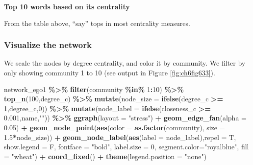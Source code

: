 \documentclass[
]{article}
\newenvironment{Shaded}{\begin{snugshade}}{\end{snugshade}}
\newcommand{\AttributeTok}[1]{\textcolor[rgb]{0.13,0.29,0.53}{#1}}
\newcommand{\DecValTok}[1]{\textcolor[rgb]{0.00,0.00,0.81}{#1}}
\newcommand{\FloatTok}[1]{\textcolor[rgb]{0.00,0.00,0.81}{#1}}
\newcommand{\FunctionTok}[1]{\textcolor[rgb]{0.13,0.29,0.53}{\textbf{#1}}}
\newcommand{\NormalTok}[1]{#1}
\newcommand{\SpecialCharTok}[1]{\textcolor[rgb]{0.81,0.36,0.00}{\textbf{#1}}}
\newcommand{\StringTok}[1]{\textcolor[rgb]{0.31,0.60,0.02}{#1}}
\begin{document}
\normalsize

\textbf{Top 10 words based on its centrality}

From the table above, ``say'' tops in most centrality measures.

\hypertarget{visualize-the-network}{%
\subsubsection{Visualize the network}\label{visualize-the-network}}

We scale the nodes by degree centrality, and color it by community. We filter by only showing community 1 to 10 (see output in Figure \ref{fig:ch6fig633}).

\begin{Shaded}
\begin{Highlighting}[]
\NormalTok{network\_ego1 }\SpecialCharTok{\%\textgreater{}\%}
  \FunctionTok{filter}\NormalTok{(community }\SpecialCharTok{\%in\%} \DecValTok{1}\SpecialCharTok{:}\DecValTok{10}\NormalTok{) }\SpecialCharTok{\%\textgreater{}\%}
  \FunctionTok{top\_n}\NormalTok{(}\DecValTok{100}\NormalTok{,degree\_c) }\SpecialCharTok{\%\textgreater{}\%}
  \FunctionTok{mutate}\NormalTok{(}\AttributeTok{node\_size =} \FunctionTok{ifelse}\NormalTok{(degree\_c }\SpecialCharTok{\textgreater{}=} \DecValTok{1}\NormalTok{,degree\_c,}\DecValTok{0}\NormalTok{)) }\SpecialCharTok{\%\textgreater{}\%}
  \FunctionTok{mutate}\NormalTok{(}\AttributeTok{node\_label =} \FunctionTok{ifelse}\NormalTok{(closeness\_c }\SpecialCharTok{\textgreater{}=} \FloatTok{0.001}\NormalTok{,name,}\StringTok{""}\NormalTok{)) }\SpecialCharTok{\%\textgreater{}\%}
  \FunctionTok{ggraph}\NormalTok{(}\AttributeTok{layout =} \StringTok{"stress"}\NormalTok{) }\SpecialCharTok{+}
  \FunctionTok{geom\_edge\_fan}\NormalTok{(}\AttributeTok{alpha =} \FloatTok{0.05}\NormalTok{) }\SpecialCharTok{+}
  \FunctionTok{geom\_node\_point}\NormalTok{(}\FunctionTok{aes}\NormalTok{(}\AttributeTok{color =} \FunctionTok{as.factor}\NormalTok{(community), }\AttributeTok{size =} \FloatTok{1.5}\SpecialCharTok{*}\NormalTok{node\_size)) }\SpecialCharTok{+}
  \FunctionTok{geom\_node\_label}\NormalTok{(}\FunctionTok{aes}\NormalTok{(}\AttributeTok{label =}\NormalTok{ node\_label),}\AttributeTok{repel =}\NormalTok{ T,}
                 \AttributeTok{show.legend =}\NormalTok{ F, }\AttributeTok{fontface =} \StringTok{"bold"}\NormalTok{, }\AttributeTok{label.size =} \DecValTok{0}\NormalTok{,}
                 \AttributeTok{segment.color=}\StringTok{"royalblue"}\NormalTok{, }\AttributeTok{fill =} \StringTok{"wheat"}\NormalTok{) }\SpecialCharTok{+}
  \FunctionTok{coord\_fixed}\NormalTok{() }\SpecialCharTok{+}
  \FunctionTok{theme}\NormalTok{(}\AttributeTok{legend.position =} \StringTok{"none"}\NormalTok{)}
\end{Highlighting}
\end{Shaded}
\end{document}
